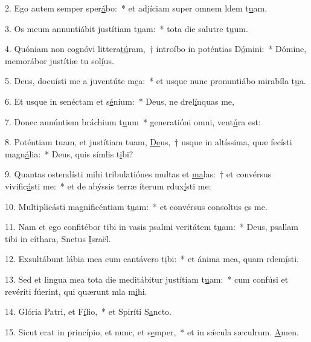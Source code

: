 2. Ego autem semper sper\uline{á}bo:~* et adjíciam super omnem ldem t\uline{u}am.\par 
3. Os meum annuntiábit justítiam t\uline{u}am:~* tota die salutre t\uline{u}um.\par 
4. Quóniam non cognóvi littera\uline{tú}ram,~† introíbo in poténtias D\uline{ó}mini:~* Dómine, memorábor justítiæ tu sol\uline{í}us.\par 
5. Deus, docuísti me a juventúte m\uline{e}a:~* et usque nunc pronuntiábo mirabíla t\uline{u}a.\par 
6. Et usque in senéctam et s\uline{é}nium:~* Deus, ne drel\uline{í}nquas me,\par 
7. Donec annúntiem bráchium t\uline{u}um~* generatióni omni,  vent\uline{ú}ra est:\par 
8. Poténtiam tuam, et justítiam tuam, \uline{De}us,~† usque in altíssima, quæ fecísti magn\uline{á}lia:~* Deus, quis símlis t\uline{i}bi?\par 
9. Quantas ostendísti mihi tribulatiónes multas et \uline{ma}las:~† et convérsus vivific\uline{á}sti me:~* et de abýssis terræ íterum rdux\uline{í}sti me:\par 
10. Multiplicásti magnificéntiam t\uline{u}am:~* et convérsus consoltus \uline{e}s me.\par 
11. Nam et ego confitébor tibi in vasis psalmi veritátem t\uline{u}am:~* Deus, psallam tibi in cíthara, Snctus \uline{I}sraël.\par 
12. Exsultábunt lábia mea cum cantávero t\uline{i}bi:~* et ánima mea, quam rdem\uline{í}sti.\par 
13. Sed et lingua mea tota die meditábitur justítiam t\uline{u}am:~* cum confúsi et revériti fúerint, qui quærunt mla m\uline{i}hi.\par 
14. Glória Patri, et F\uline{í}lio,~* et Spiríti S\uline{a}ncto.\par 
15. Sicut erat in princípio, et nunc, et s\uline{e}mper,~* et in sǽcula sæculrum. \uline{A}men.\par 
